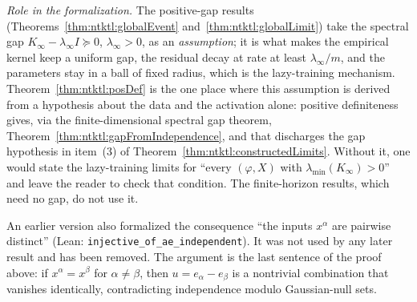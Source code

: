 \begin{remark}
\emph{Role in the formalization.} The positive-gap results (Theorems~\ref{thm:ntktl:globalEvent} and~\ref{thm:ntktl:globalLimit}) take the spectral gap
$K_\infty-\lambda_\infty I\succeq0$, $\lambda_\infty>0$, as an \emph{assumption}; it is what makes the empirical kernel keep a uniform gap, the residual decay at rate at least $\lambda_\infty/m$,
and the parameters stay in a ball of fixed radius, which is the lazy-training mechanism. Theorem~\ref{thm:ntktl:posDef} is the one place where this assumption is
derived from a hypothesis about the data and the activation alone: positive definiteness gives, via the finite-dimensional spectral gap theorem,
Theorem~\ref{thm:ntktl:gapFromIndependence}, and that discharges the gap hypothesis in item~(3) of Theorem~\ref{thm:ntktl:constructedLimits}. Without it, one would state
the lazy-training limits for ``every $(\varphi,X)$ with $\lambda_{\min}(K_\infty)>0$'' and leave the reader to check that condition. The finite-horizon results, which need no gap, do not use it.
\end{remark}

\begin{remark}\label{rmk:ntktl:posDefChange}
An earlier version also formalized the consequence ``the inputs $x^\alpha$ are pairwise distinct'' (Lean: \texttt{injective\_of\_ae\_independent}). It was not used by any later result and has been removed. The argument is the last sentence of the proof above: if $x^\alpha=x^\beta$ for $\alpha\ne\beta$, then $u=e_\alpha-e_\beta$ is a nontrivial combination that vanishes identically, contradicting independence modulo Gaussian-null sets.
\end{remark}


